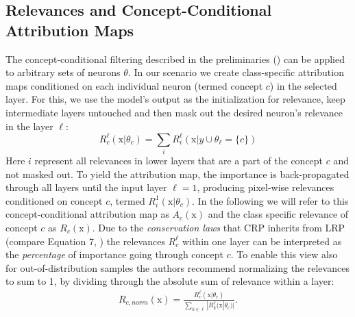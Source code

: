 \subsection{Relevances and Concept-Conditional Attribution Maps}
The concept-conditional filtering described in the preliminaries () can be applied to arbitrary sets of neurons $\theta$. In our scenario we create class-specific attribution maps conditioned on each individual neuron (termed concept $c$) in the selected layer. For this, we use the model's output as the initialization for relevance, keep intermediate layers untouched and then mask out the desired neuron's relevance in the layer $\ell$: 
\begin{equation}
    R^{\ell}_{c}(\mathrm{x} |\theta_{c}) = \sum_{i} R_i^{\ell}(\mathrm{x} |y \cup \theta_{\ell} = \{c\})
\end{equation}
Here $i$ represent all relevances in lower layers that are a part of the concept $c$ and not masked out. 
To yield the attribution map, the importance is back-propagated through all layers until the input layer $\ell = 1$, producing pixel-wise relevances conditioned on concept $c$, termed $R_{i}^{1}(\mathrm{x} |\theta_{c})$. In the following we will refer to this concept-conditional attribution map as $A_c(\mathrm{x})$ and the class specific relevance of concept $c$ as $R_c(\mathrm{x})$. Due to the \textit{conservation laws} that CRP inherits from LRP (compare Equation 7, \cite{Achtibat2022}) the relevances $R_c^{\ell}$ within one layer can be interpreted as the \textit{percentage} of importance going through concept $c$. To enable this view also for out-of-distribution samples the authors recommend normalizing the relevances to sum to 1, by dividing through the absolute sum of relevance within a layer:
\begin{align}\label{eq:normed_relevance}
    R_{c,norm}(\mathrm{x}) = \frac{R_{c}^{\ell}(\mathrm{x} |\theta_{c}) }{\sum_{k \in \ell} |R_k^{\ell}(\mathrm{x} |\theta_{c})|}.
\end{align}

